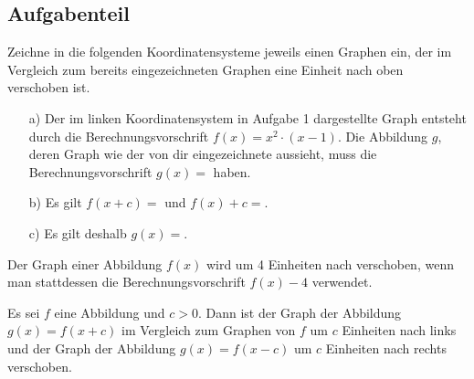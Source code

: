 \documentclass[]{uebungsblatt}
\begin{document}
\subsection*{Aufgabenteil}
\begin{exercise}
    Zeichne in die folgenden Koordinatensysteme jeweils einen Graphen ein, der im Vergleich zum bereits eingezeichneten Graphen eine Einheit nach oben verschoben ist. 
    \begin{multicols}{2}\centering
        
    \end{multicols}
\end{exercise}
\begin{exercise}
    \begin{enumerate}
        \item[a)] Der im linken Koordinatensystem in Aufgabe 1 dargestellte Graph entsteht durch die Berechnungsvorschrift $f(x)=x^2\cdot (x-1)$. Die Abbildung $g$, deren Graph wie der von dir eingezeichnete aussieht, muss die Berechnungsvorschrift $g(x)=$ haben.
        \item[b)] Es gilt $f(x+c)=$ und $f(x)+c=$.
        \item[c)] Es gilt deshalb $g(x)=$.
    \end{enumerate}
\end{exercise}
\begin{exercise}
    Der Graph einer Abbildung $f(x)$ wird um 4 Einheiten nach  verschoben, wenn man stattdessen die Berechnungsvorschrift $f(x)-4$ verwendet.
\end{exercise}
\begin{remark}{}
    Es sei $f$ eine Abbildung und $c>0$. Dann ist der Graph der Abbildung $g(x)=f(x+c)$ im Vergleich zum Graphen von $f$ um $c$ Einheiten nach links und der Graph der Abbildung $g(x)=f(x-c)$ um $c$ Einheiten nach rechts verschoben.
\end{remark}
\end{document}
